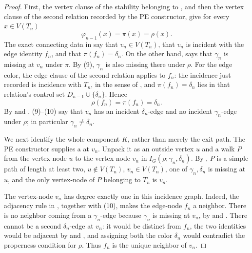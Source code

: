 \begin{proof}
First, the vertex clause of the stability belonging to
, and then the vertex clause of the second
 relation recorded by the PE constructor, give
for every \(x\in V(T_n)\)
\[
 \overline{\varphi_{n-1}}(x)=\overline\pi(x)=\overline\rho(x).  \tag{9}
\]
The exact connecting data in  say that
\(v_n\in V(T_n)\), that \(v_n\) is incident with the edge identity
\(f_n\), and that \(\pi(f_n)=\delta_n\).  On the other hand,
 says that \(\gamma_n\) is missing at
\(v_n\) under \(\pi\).  By (9), \(\gamma_n\) is also missing there under
\(\rho\).  For the edge color, the edge clause of the second
 relation applies to \(f_n\): the incidence just
recorded is incidence with \(T_n\), in the sense of
, and \(\pi(f_n)=\delta_n\) lies in that relation's
control set \(D_{n-1}\cup\{\delta_n\}\).  Hence
\[
 \rho(f_n)=\pi(f_n)=\delta_n.                                  \tag{10}
\]
By  and , (9)--(10) say
that \(v_n\) has an incident \(\delta_n\)-edge and no incident
\(\gamma_n\)-edge under \(\rho\); in particular
\(\gamma_n\ne\delta_n\).

We next identify the whole component \(K\), rather than merely the exit
path.  The PE constructor supplies a  at \(v_n\).
Unpack it as an outside vertex \(u\) and a walk \(P\) from the
vertex-node \(u\) to the vertex-node \(v_n\) in
\(I_G(\rho;\gamma_n,\delta_n)\).  By
, \(P\) is a simple path of length at least two,
\(u\notin V(T_n)\), \(v_n\in V(T_n)\), one of
\(\gamma_n,\delta_n\) is missing at \(u\), and the only vertex-node of
\(P\) belonging to \(T_n\) is \(v_n\).

The vertex-node \(v_n\) has degree exactly one in this incidence graph.
Indeed, the adjacency rule in , together
with (10), makes the edge-node \(f_n\) a neighbor.  There is no neighbor
coming from a \(\gamma_n\)-edge because \(\gamma_n\) is missing at
\(v_n\), by  and .  There
cannot be a second \(\delta_n\)-edge at \(v_n\): it would be distinct
from \(f_n\), the two identities would be adjacent by
 and , and assigning both the
color \(\delta_n\) would contradict the properness condition
 for \(\rho\).  Thus \(f_n\) is the unique
neighbor of \(v_n\).


\end{proof}
